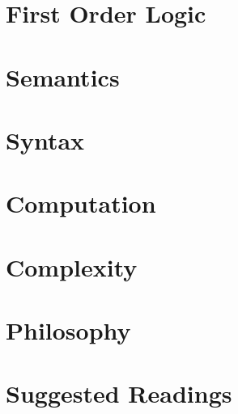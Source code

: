 \newpage
\part{First Order Logic}

\newpage
\part{Semantics}

\newpage
\part{Syntax}

\newpage
\part{Computation}

\newpage
\part{Complexity}

\newpage
\part{Philosophy}

\newpage
\part{Suggested Readings}